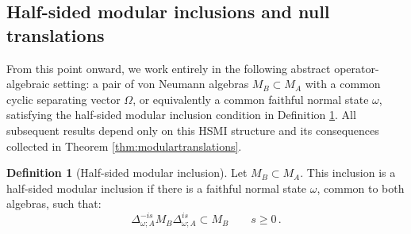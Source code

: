 \documentclass[11pt,a4paper]{article}
\theoremstyle{plain}
\numberwithin{theorem}{section}
\theoremstyle{definition}
\newtheorem{definition}[theorem]{Definition}
\newcommand{\?}{\overset{?}{=}}
\newcommand{\W}{\Omega}
\begin{document}
\subsection{Half-sided modular inclusions and null translations}

From this point onward, we work entirely in the following abstract operator-algebraic setting: a pair of von Neumann algebras $M_B\subset M_A$ with a common cyclic separating vector $\W$, or equivalently a common faithful normal state $\omega$, satisfying the half-sided modular inclusion condition in Definition \ref{def:HSMI}. All subsequent results depend only on this HSMI structure and its consequences collected in Theorem \ref{thm:modulartranslations}.


\begin{definition}[Half-sided modular inclusion]
\label{def:HSMI}
Let $M_B \subset M_A$. This inclusion is a half-sided modular inclusion if there is a faithful normal state $\omega$, common to both algebras, such that:
\begin{equation}
\Delta_{\omega;A}^{-is} M_B \Delta_{\omega;A}^{is} \subset M_B \qquad s \geq 0\,.
\end{equation}
\end{definition}
\end{document}

